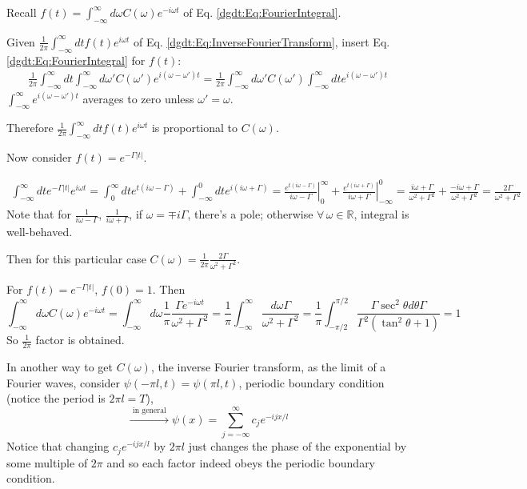 Recall $f(t) = \int_{-\infty}^{\infty} d\omega C(\omega) e^{-i\omega t}$ of Eq. \ref{dgdt:Eq:FourierIntegral}. 

Given $\frac{1}{2\pi}\int_{-\infty}^{\infty} dt f(t) e^{i\omega t}$ of Eq. \ref{dgdt:Eq:InverseFourierTransform}, insert Eq. \ref{dgdt:Eq:FourierIntegral} for $f(t)$:
\[
\begin{gathered}
	\frac{1}{2\pi} \int_{-\infty}^{\infty}dt \int_{-\infty}^{\infty} d\omega' C(\omega') e^{i (\omega- \omega')t} = \frac{1}{2\pi} \int_{-\infty}^{\infty} d\omega' C(\omega') \int_{-\infty}^{\infty} dt e^{i (\omega - \omega') t} 
\end{gathered}
\]
$\int_{-\infty}^{\infty} e^{ i(\omega - \omega') t} $ averages to zero unless $\omega' = \omega$.

Therefore $\frac{1}{2\pi} \int_{-\infty}^{\infty} dt f(t) e^{i\omega t} $ is proportional to $C(\omega)$.

Now consider $f(t) = e^{-\Gamma|t|}$.

\[
\begin{gathered}
	\int_{-\infty}^{\infty} dt e^{-\Gamma|t|} e^{i\omega t} =\int_0^{\infty} dt e^{t(i\omega - \Gamma)} + \int_{-\infty}^0 dt e^{i(i\omega + \Gamma) } = \left. \frac{ e^{t(i\omega - \Gamma)} }{ i\omega - \Gamma} \right|_0^{\infty} + \left. \frac{ e^{t(i\omega + \Gamma)} }{ i\omega + \Gamma} \right|_{-\infty}^0 = \frac{ i\omega + \Gamma}{ \omega^2 + \Gamma^2} + \frac{-i\omega + \Gamma}{ \omega^2 +\Gamma^2} = \frac{2\Gamma}{ \omega^2 + \Gamma^2}
\end{gathered}
\]
Note that for $\frac{1}{ i\omega - \Gamma}$, $\frac{1}{ i\omega + \Gamma}$, if $\omega = \mp i\Gamma$, there's a pole; otherwise $\forall \, \omega \in \mathbb{R}$, integral is well-behaved.

Then for this particular case $C(\omega) = \frac{1}{2\pi} \frac{ 2\Gamma}{ \omega^2 + \Gamma^2}$.

For $f(t) = e^{-\Gamma |t|}$, $f(0) = 1$. Then
\[
\int_{-\infty}^{\infty} d\omega C(\omega) e^{-i\omega t} = \int_{-\infty}^{\infty} d\omega \frac{1}{\pi} \frac{ \Gamma e^{-i\omega t} }{ \omega^2 + \Gamma^2} = \frac{1}{\pi} \int_{-\infty}^{\infty} \frac{d\omega \Gamma}{ \omega^2 + \Gamma^2} = \frac{1}{ \pi} \int_{-\pi/2}^{\pi/2} \frac{ \Gamma \sec^2{\theta} d\theta \Gamma}{ \Gamma^2 (\tan^2{\theta} + 1) } = 1
\]
So $\frac{1}{2\pi}$ factor is obtained.

In another way to get $C(\omega)$, the inverse Fourier transform, as the limit of a Fourier waves, consider $\psi(-\pi l,t) = \psi(\pi l,t) $, periodic boundary condition (notice the period is $2\pi l = T$), 
\[
\xrightarrow{ \text{ in general } } \psi(x) = \sum_{j=-\infty}^{\infty} c_j e^{-ijx/l}
\]
Notice that changing $c_j e^{-ijx/l}$ by $2\pi l$ just changes the phase of the exponential by some multiple of $2\pi$ and so each factor indeed obeys the periodic boundary condition.

